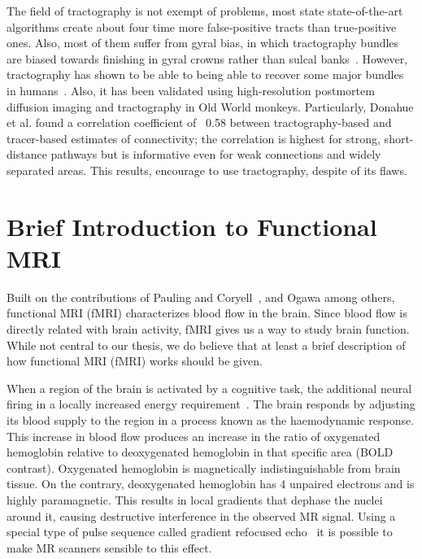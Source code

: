 The field of tractography is not exempt of problems, most state state-of-the-art
algorithms create about four time more false‐positive tracts than true‐positive
ones. Also, most of them suffer from gyral bias, in which tractography bundles
are biased towards finishing in gyral crowns rather than sulcal banks~\cite{VanEssen2014}.
However, tractography has shown to be able to being able to recover some major
bundles in humans~\cite{Catani2008}. Also, it has been validated using high-resolution
postmortem diffusion imaging and tractography in Old World monkeys. Particularly,
Donahue et al.\cite{Donahue2016} found a correlation
coefficient of ~0.58 between tractography-based and tracer-based estimates of
connectivity; the correlation is highest for strong, short-distance pathways
but is informative even for weak connections and widely separated areas. This
results, encourage to use tractography, despite of its flaws.

\section{Brief Introduction to Functional MRI}

Built on the contributions of Pauling and Coryell~\cite{Pauling1936}, and 
Ogawa\cite{Ogawa1990, Ogawa1993} among others, functional MRI (fMRI) characterizes
blood flow in the brain. Since blood flow is directly related with brain
activity, fMRI gives us a way to study brain function. While not central to our
thesis, we do believe that at least a brief description of how functional MRI
(fMRI) works should be given.

When a region of the brain is activated by a cognitive task, the additional
neural firing in a locally increased energy requirement~\cite{Glover2011}.
The brain responds by adjusting its blood supply to the region in a process
known as the haemodynamic response. This increase in blood flow produces an
increase in the ratio of oxygenated hemoglobin relative to deoxygenated hemoglobin
in that specific area (BOLD contrast). Oxygenated hemoglobin is magnetically 
indistinguishable from brain tissue. On the contrary, deoxygenated hemoglobin
has 4 unpaired electrons and is highly paramagnetic\cite{Glover2011}. This
results in local gradients that dephase the nuclei around it, causing destructive
interference in the observed MR signal. Using a special type of pulse sequence
called gradient refocused echo~\cite{Elster1993} it is possible to make MR
scanners sensible to this effect.


